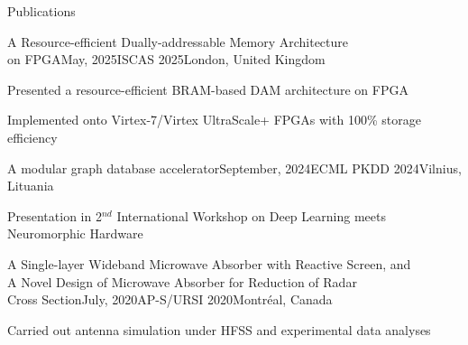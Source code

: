 \documentclass{resume} %
\begin{document}
\begin{rSection}{Publications}

	
	\begin{rSubsection}{A Resource-efficient Dually-addressable Memory Architecture\\on FPGA}{May, 2025}{ISCAS 2025}{London, United Kingdom}
		\item Presented a resource-efficient BRAM-based DAM architecture on FPGA
		\item Implemented onto Virtex-7/Virtex UltraScale+ FPGAs with 100\% storage efficiency
	\end{rSubsection}
	
	\begin{rSubsection}{A modular graph database accelerator}{September, 2024}{ECML PKDD 2024}{Vilnius, Lituania}
		\item Presentation in 2$^{nd}$ International Workshop on Deep Learning meets Neuromorphic Hardware
	\end{rSubsection}
	
	\begin{rSubsection}{A Single-layer Wideband Microwave Absorber with Reactive Screen, and\\A Novel Design of Microwave Absorber for Reduction of Radar\\Cross Section}{July, 2020}{AP-S/URSI 2020}{Montréal, Canada}
		\item Carried out antenna simulation under HFSS and experimental data analyses
	\end{rSubsection}

\end{rSection}

\newpage
\end{document}
